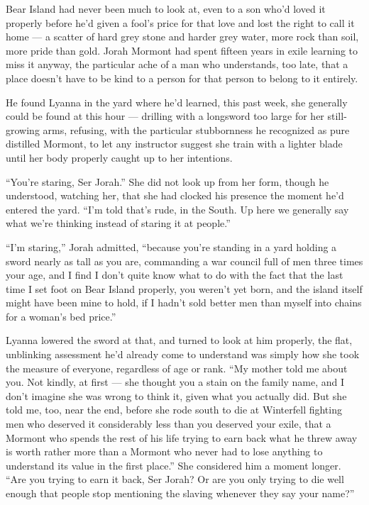 Bear Island had never been much to look at, even to a son who’d loved it properly before he’d given a fool’s price for that love and lost the right to call it home — a scatter of hard grey stone and harder grey water, more rock than soil, more pride than gold. Jorah Mormont had spent fifteen years in exile learning to miss it anyway, the particular ache of a man who understands, too late, that a place doesn’t have to be kind to a person for that person to belong to it entirely.

He found Lyanna in the yard where he’d learned, this past week, she generally could be found at this hour — drilling with a longsword too large for her still-growing arms, refusing, with the particular stubbornness he recognized as pure distilled Mormont, to let any instructor suggest she train with a lighter blade until her body properly caught up to her intentions.

“You’re staring, Ser Jorah.” She did not look up from her form, though he understood, watching her, that she had clocked his presence the moment he’d entered the yard. “I’m told that’s rude, in the South. Up here we generally say what we’re thinking instead of staring it at people.”

“I’m staring,” Jorah admitted, “because you’re standing in a yard holding a sword nearly as tall as you are, commanding a war council full of men three times your age, and I find I don’t quite know what to do with the fact that the last time I set foot on Bear Island properly, you weren’t yet born, and the island itself might have been mine to hold, if I hadn’t sold better men than myself into chains for a woman’s bed price.”

Lyanna lowered the sword at that, and turned to look at him properly, the flat, unblinking assessment he’d already come to understand was simply how she took the measure of everyone, regardless of age or rank. “My mother told me about you. Not kindly, at first — she thought you a stain on the family name, and I don’t imagine she was wrong to think it, given what you actually did. But she told me, too, near the end, before she rode south to die at Winterfell fighting men who deserved it considerably less than you deserved your exile, that a Mormont who spends the rest of his life trying to earn back what he threw away is worth rather more than a Mormont who never had to lose anything to understand its value in the first place.” She considered him a moment longer. “Are you trying to earn it back, Ser Jorah? Or are you only trying to die well enough that people stop mentioning the slaving whenever they say your name?”

